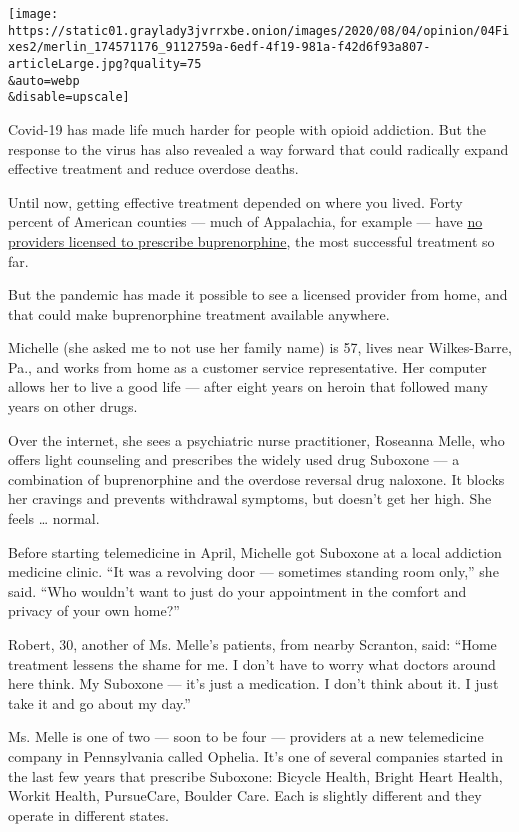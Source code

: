 \texttt{[image: https://static01.graylady3jvrrxbe.onion/images/2020/08/04/opinion/04Fixes2/merlin\_174571176\_9112759a-6edf-4f19-981a-f42d6f93a807-articleLarge.jpg?quality=75\\\&auto=webp\\\&disable=upscale]}

Covid-19 has made life much harder for people with opioid addiction. But
the response to the virus has also revealed a way forward that could
radically expand effective treatment and reduce overdose deaths.

Until now, getting effective treatment depended on where you lived.
Forty percent of American counties --- much of Appalachia, for example
--- have \href{https://oig.hhs.gov/oei/reports/oei-12-17-00240.asp}{no
providers licensed to prescribe buprenorphine}, the most successful
treatment so far.

But the pandemic has made it possible to see a licensed provider from
home, and that could make buprenorphine treatment available anywhere.

Michelle (she asked me to not use her family name) is 57, lives near
Wilkes-Barre, Pa., and works from home as a customer service
representative. Her computer allows her to live a good life --- after
eight years on heroin that followed many years on other drugs.

Over the internet, she sees a psychiatric nurse practitioner, Roseanna
Melle, who offers light counseling and prescribes the widely used drug
Suboxone --- a combination of buprenorphine and the overdose reversal
drug naloxone. It blocks her cravings and prevents withdrawal symptoms,
but doesn't get her high. She feels \ldots{} normal.

Before starting telemedicine in April, Michelle got Suboxone at a local
addiction medicine clinic. ``It was a revolving door --- sometimes
standing room only,'' she said. ``Who wouldn't want to just do your
appointment in the comfort and privacy of your own home?''

Robert, 30, another of Ms. Melle's patients, from nearby Scranton, said:
``Home treatment lessens the shame for me. I don't have to worry what
doctors around here think. My Suboxone --- it's just a medication. I
don't think about it. I just take it and go about my day.''

Ms. Melle is one of two --- soon to be four --- providers at a new
telemedicine company in Pennsylvania called Ophelia. It's one of several
companies started in the last few years that prescribe Suboxone: Bicycle
Health, Bright Heart Health, Workit Health, PursueCare, Boulder Care.
Each is slightly different and they operate in different states.

